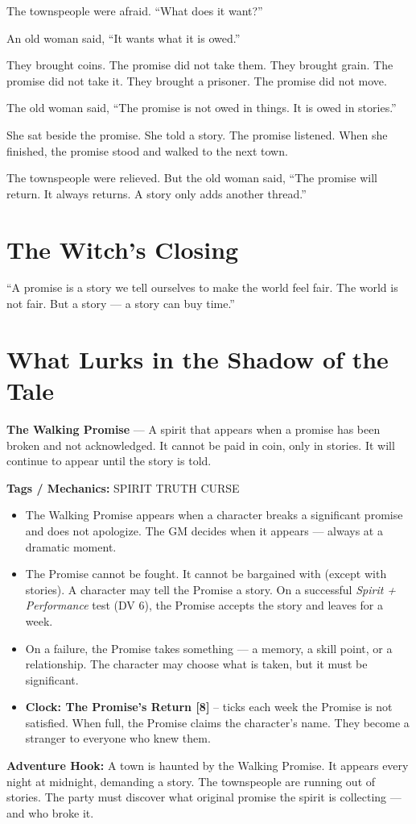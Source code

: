 \documentclass[10pt,twoside]{book}
\newcommand{\tag}[1]{\textsc{#1}}
\begin{document}
The townspeople were afraid. ``What does it want?''

An old woman said, ``It wants what it is owed.''

They brought coins. The promise did not take them. They brought grain. The promise did not take it. They brought a prisoner. The promise did not move.

The old woman said, ``The promise is not owed in things. It is owed in stories.''

She sat beside the promise. She told a story. The promise listened. When she finished, the promise stood and walked to the next town.

The townspeople were relieved. But the old woman said, ``The promise will return. It always returns. A story only adds another thread.''

\section*{The Witch's Closing}
``A promise is a story we tell ourselves to make the world feel fair. The world is not fair. But a story --- a story can buy time.''

\section*{What Lurks in the Shadow of the Tale}
\begin{infobox}
\textbf{The Walking Promise} --- A spirit that appears when a promise has been broken and not acknowledged. It cannot be paid in coin, only in stories. It will continue to appear until the story is told.

\textbf{Tags / Mechanics:} \tag{SPIRIT} \tag{TRUTH} \tag{CURSE}

\begin{itemize}
\item The Walking Promise appears when a character breaks a significant promise and does not apologize. The GM decides when it appears --- always at a dramatic moment.
\item The Promise cannot be fought. It cannot be bargained with (except with stories). A character may tell the Promise a story. On a successful \textit{Spirit + Performance} test (DV 6), the Promise accepts the story and leaves for a week.
\item On a failure, the Promise takes something --- a memory, a skill point, or a relationship. The character may choose what is taken, but it must be significant.
\item \textbf{Clock: The Promise's Return [8]} -- ticks each week the Promise is not satisfied. When full, the Promise claims the character's name. They become a stranger to everyone who knew them.
\end{itemize}

\textbf{Adventure Hook:} A town is haunted by the Walking Promise. It appears every night at midnight, demanding a story. The townspeople are running out of stories. The party must discover what original promise the spirit is collecting --- and who broke it.
\end{infobox}
\end{document}
